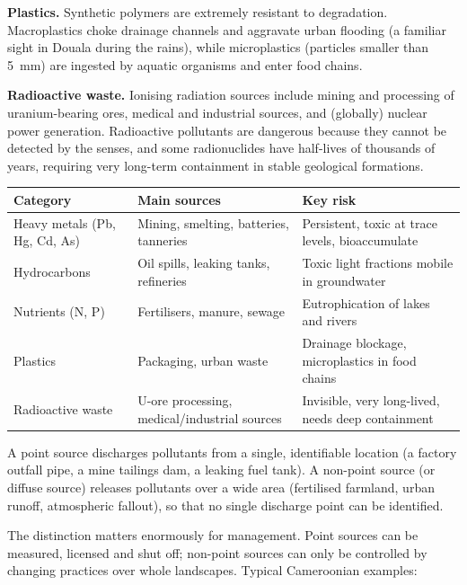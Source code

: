 \documentclass[11pt]{article}
\newcommand{\cle}[1]{{\popxbold\color{popdark}#1}}
\newcounter{popsec}
\newcounter{popsub}
\newcommand{\courssub}[1]{%
  \stepcounter{popsub}%
  \par\vspace{9pt}\noindent{\popxbold\fontsize{11.5}{13}\selectfont\color{popink}{\color{poporange}\thepopsec.\thepopsub}\hspace{6pt}#1}\par\nopagebreak\vspace{4pt}
}
\begin{document}
\textbf{Plastics.} Synthetic polymers are extremely resistant to degradation. Macroplastics choke drainage channels and aggravate urban flooding (a familiar sight in Douala during the rains), while \cle{microplastics} (particles smaller than \SI{5}{mm}) are ingested by aquatic organisms and enter food chains.

\textbf{Radioactive waste.} Ionising radiation sources include mining and processing of uranium-bearing ores, medical and industrial sources, and (globally) nuclear power generation. Radioactive pollutants are dangerous because they cannot be detected by the senses, and some radionuclides have half-lives of thousands of years, requiring very long-term containment in stable geological formations.

\begin{center}
\begin{tabularx}{\linewidth}{|l|X|X|}
\hline
\rowcolor{popblueL} \textbf{Category} & \textbf{Main sources} & \textbf{Key risk} \\
\hline
Heavy metals (Pb, Hg, Cd, As) & Mining, smelting, batteries, tanneries & Persistent, toxic at trace levels, bioaccumulate \\
\hline
Hydrocarbons & Oil spills, leaking tanks, refineries & Toxic light fractions mobile in groundwater \\
\hline
Nutrients (N, P) & Fertilisers, manure, sewage & Eutrophication of lakes and rivers \\
\hline
Plastics & Packaging, urban waste & Drainage blockage, microplastics in food chains \\
\hline
Radioactive waste & U-ore processing, medical/industrial sources & Invisible, very long-lived, needs deep containment \\
\hline
\end{tabularx}
\end{center}

\courssub{Point Sources and Non-Point Sources}

\begin{definition}
A \cle{point source} discharges pollutants from a single, identifiable location (a factory outfall pipe, a mine tailings dam, a leaking fuel tank). A \cle{non-point source} (or diffuse source) releases pollutants over a wide area (fertilised farmland, urban runoff, atmospheric fallout), so that no single discharge point can be identified.
\end{definition}

The distinction matters enormously for management. Point sources can be measured, licensed and shut off; non-point sources can only be controlled by changing practices over whole landscapes. Typical Cameroonian examples:
\end{document}
